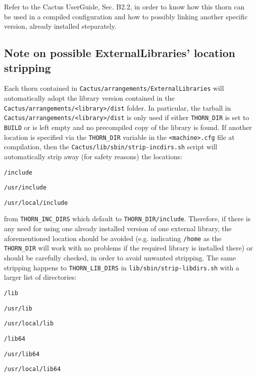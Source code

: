 \documentclass{article}
\begin{document}
Refer to the Cactus UserGuide, Sec. B2.2, in order to know how this thorn can be used in a compiled configuration and how to possibly linking another specific version, already installed steparately.

\subsection*{Note on possible ExternalLibraries' location stripping}
\label{stripping}

Each thorn contained in \texttt{Cactus/arrangements/ExternalLibraries} will automatically adopt the library version contained in the \texttt{Cactus/arrangements/<library>/dist} folder. In particular, the tarball in \texttt{Cactus/arrangements/<library>/dist} is only used if either \texttt{THORN\_DIR} is set to \texttt{BUILD} or is left empty and no precompiled copy of the library is found. If another location is specified via the \texttt{THORN\_DIR} variable in the \texttt{<machine>.cfg} file at compilation, then the \texttt{Cactus/lib/sbin/strip-incdirs.sh} script will automatically strip away (for safety reasons) the locations:
\begin{Lentry}
\item [\texttt{/include}]
\item [\texttt{/usr/include}]
\item [\texttt{/usr/local/include}]
\end{Lentry}
from \texttt{THORN\_INC\_DIRS} which default to \texttt{THORN\_DIR/include}. Therefore, if there is any need for using one already installed version of one external library, the aforementioned location should be avoided (e.g. indicating \texttt{/home} as the \texttt{THORN\_DIR} will work with no problems if the required library is installed there) or should be carefully checked, in order to avoid unwanted stripping. The same stripping happens to \texttt{THORN\_LIB\_DIRS} in \texttt{lib/sbin/strip-libdirs.sh} with a larger list of directories:
\begin{Lentry}
\item [\texttt{/lib}]
\item [\texttt{/usr/lib}]
\item [\texttt{/usr/local/lib}]
\item [\texttt{/lib64}]
\item [\texttt{/usr/lib64}]
\item [\texttt{/usr/local/lib64}] 
\end{Lentry}

\end{document}
